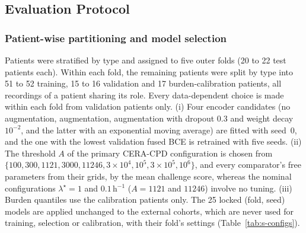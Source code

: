 \documentclass[preprint,12pt]{elsarticle}
\newcommand{\method}{CERA-CPD}
\newcommand{\1}{\mathbf{1}}
\begin{document}
\begin{table}[!htbp]
\centering
\caption{Datasets and their use (all from PhysioNet, with durations and counts of the files analysed).}
\label{tab:datasets}
\footnotesize
\setlength{\tabcolsep}{2.5pt}
\end{table}

\subsection{Evaluation Protocol}
\label{sec:protocol}
\subsubsection{Patient-wise partitioning and model selection}
Patients were stratified by type and assigned to five outer folds (20 to 22 test patients each). Within each fold, the remaining patients were split by type into 51 to 52 training, 15 to 16 validation and 17 burden-calibration patients, all recordings of a patient sharing its role. Every data-dependent choice is made within each fold from validation patients only. (i) Four encoder candidates (no augmentation, augmentation, augmentation with dropout 0.3 and weight decay $10^{-2}$, and the latter with an exponential moving average) are fitted with seed~0, and the one with the lowest validation fused BCE is retrained with five seeds. (ii) The threshold $A$ of the primary \method{} configuration is chosen from $\{100,300,1121,3000,11246,3\times10^4,10^5,3\times10^5,10^6\}$, and every comparator's free parameters from their grids, by the mean challenge score, whereas the nominal configurations $\lambda^\star=1$ and $0.1$\,h$^{-1}$ ($A=1121$ and $11246$) involve no tuning. (iii) Burden quantiles use the calibration patients only. The 25 locked (fold, seed) models are applied unchanged to the external cohorts, which are never used for training, selection or calibration, with their fold's settings (Table~\ref{tab:s-configs}).
\end{document}
